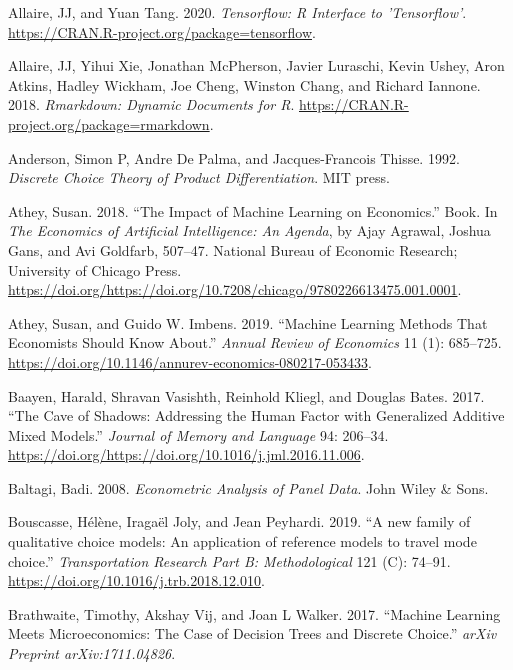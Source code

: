 \documentclass[12pt,]{article}
\begin{document}
\leavevmode\hypertarget{ref-R-tensorflow}{}%
Allaire, JJ, and Yuan Tang. 2020. \emph{Tensorflow: R Interface to
'Tensorflow'}. \url{https://CRAN.R-project.org/package=tensorflow}.

\leavevmode\hypertarget{ref-R-rmarkdown}{}%
Allaire, JJ, Yihui Xie, Jonathan McPherson, Javier Luraschi, Kevin
Ushey, Aron Atkins, Hadley Wickham, Joe Cheng, Winston Chang, and
Richard Iannone. 2018. \emph{Rmarkdown: Dynamic Documents for R}.
\url{https://CRAN.R-project.org/package=rmarkdown}.

\leavevmode\hypertarget{ref-anderson1992discrete}{}%
Anderson, Simon P, Andre De Palma, and Jacques-Francois Thisse. 1992.
\emph{Discrete Choice Theory of Product Differentiation}. MIT press.

\leavevmode\hypertarget{ref-athey2018iml}{}%
Athey, Susan. 2018. ``The Impact of Machine Learning on Economics.''
Book. In \emph{The Economics of Artificial Intelligence: An Agenda}, by
Ajay Agrawal, Joshua Gans, and Avi Goldfarb, 507--47. National Bureau of
Economic Research; University of Chicago Press.
\url{https://doi.org/https://doi.org/10.7208/chicago/9780226613475.001.0001}.

\leavevmode\hypertarget{ref-athey2019ml}{}%
Athey, Susan, and Guido W. Imbens. 2019. ``Machine Learning Methods That
Economists Should Know About.'' \emph{Annual Review of Economics} 11
(1): 685--725.
\url{https://doi.org/10.1146/annurev-economics-080217-053433}.

\leavevmode\hypertarget{ref-baayen2017gam}{}%
Baayen, Harald, Shravan Vasishth, Reinhold Kliegl, and Douglas Bates.
2017. ``The Cave of Shadows: Addressing the Human Factor with
Generalized Additive Mixed Models.'' \emph{Journal of Memory and
Language} 94: 206--34.
\url{https://doi.org/https://doi.org/10.1016/j.jml.2016.11.006}.

\leavevmode\hypertarget{ref-baltagi2008econometric}{}%
Baltagi, Badi. 2008. \emph{Econometric Analysis of Panel Data}. John
Wiley \& Sons.

\leavevmode\hypertarget{ref-joly2019qcm}{}%
Bouscasse, Hélène, Iragaël Joly, and Jean Peyhardi. 2019. ``A new family
of qualitative choice models: An application of reference models to
travel mode choice.'' \emph{Transportation Research Part B:
Methodological} 121 (C): 74--91.
\url{https://doi.org/10.1016/j.trb.2018.12.010}.

\leavevmode\hypertarget{ref-brathwaite2017machine}{}%
Brathwaite, Timothy, Akshay Vij, and Joan L Walker. 2017. ``Machine
Learning Meets Microeconomics: The Case of Decision Trees and Discrete
Choice.'' \emph{arXiv Preprint arXiv:1711.04826}.
\end{document}
